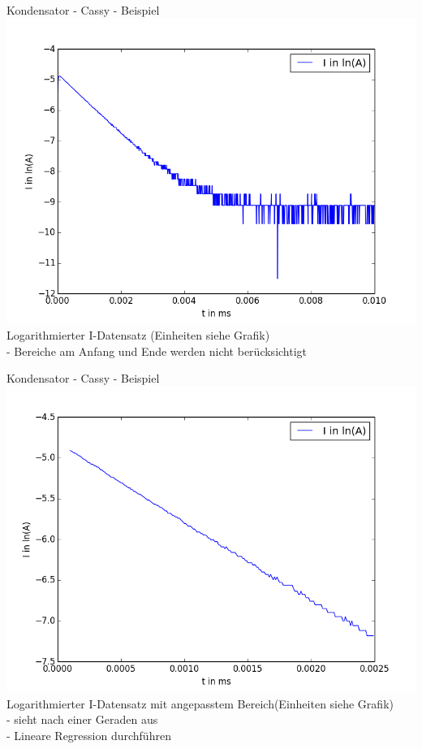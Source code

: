 \documentclass[11pt]{beamer}
\begin{document}
\begin{frame}{Kondensator - Cassy - Beispiel}
\includegraphics[scale=0.35]{ln(I)ggt.png}\\
Logarithmierter I-Datensatz (Einheiten siehe Grafik)\\
- Bereiche am Anfang und Ende werden nicht berücksichtigt
\end{frame}

\begin{frame}{Kondensator - Cassy - Beispiel}
\includegraphics[scale=0.2]{ln(Ik)ggt.png}\\
Logarithmierter I-Datensatz mit angepasstem Bereich(Einheiten siehe Grafik)\\
- sieht nach einer Geraden aus\\
- Lineare Regression durchführen\\
\end{frame}
\end{document}
